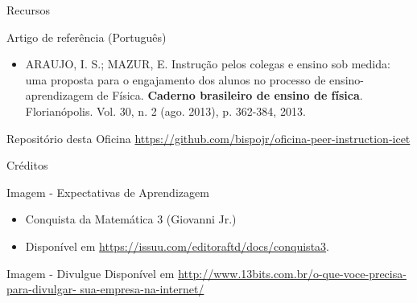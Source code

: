 \documentclass[xcolor=dvipsnames,table]{beamer}
\begin{document}
 \begin{frame}{Recursos}
 	\begin{block}{Artigo de referência (Português)}
 		\begin{itemize}
 			\item ARAUJO, I. S.; MAZUR, E. Instrução pelos colegas e ensino sob medida: uma proposta para o engajamento dos alunos no processo de ensino-aprendizagem de Física. {\bf Caderno brasileiro de ensino de física}. Florianópolis. Vol. 30, n. 2 (ago. 2013), p. 362-384, 2013.
 		\end{itemize}	
 	\end{block}
 	\begin{block}{Repositório desta Oficina}
 		\url{https://github.com/bispojr/oficina-peer-instruction-icet}
 	\end{block}
 \end{frame}

\begin{frame}{Créditos}
\begin{block}{Imagem - Expectativas de Aprendizagem}
	\begin{itemize}[label=$\bullet$]
		\item Conquista da Matemática 3 (Giovanni Jr.)
		\item Disponível em \url{https://issuu.com/editoraftd/docs/conquista3}.
	\end{itemize}
\end{block}
\begin{block}{Imagem - Divulgue}
	Disponível em {\small \url{http://www.13bits.com.br/o-que-voce-precisa-para-divulgar- sua-empresa-na-internet/}}
\end{block}
\end{frame}

	\begin{frame}
		\titlepage
	\end{frame}
	
\end{document}
